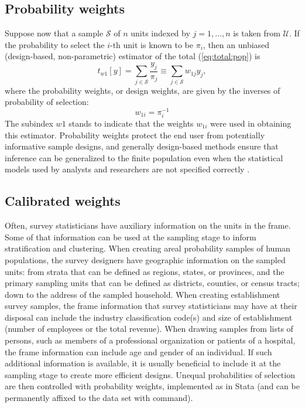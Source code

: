 \subsection{Probability weights}

Suppose now that a sample $\mathcal S$ of $n$ units indexed by $j=1,\ldots,n$
is taken from $\mathcal U$. If the probability to select the
$i$-th unit is known to be $\pi_i$, then an unbiased
(design-based, non-parametric) estimator
of the total (\ref{eq:total:pop}) is \citep{horvitz:thompson:1952}
\begin{equation}
   t_{w1}[y] = \sum_{j \in \mathcal{S}} \frac{y_j}{\pi_j}
   \equiv \sum_{j \in \mathcal{S}} w_{1j} y_j
   \label{eq:total:sample},
\end{equation}
where the probability weights, or design weights, are given by
the inverses of probability of selection:
\begin{equation}
   w_{1i} = \pi_i^{-1}
   \label{eq:prob:weight}
\end{equation}
The subindex $w1$ stands to indicate that the weights $w_{1i}$ were
used in obtaining this estimator. Probability weights protect
the end user from potentially informative sample designs, and generally
design-based methods ensure that inference can be generalized
to the finite population even when the statistical models used
by analysts and researchers are not specified correctly
\citep{pfeff:1993,binder:roberts:2003}.

\subsection{Calibrated weights}

Often, survey statisticians have auxiliary information on the units
in the frame. Some of that information can be used at the sampling
stage to inform stratification and clustering. When creating areal
probability samples of human populations, the survey designers have
geographic information on the sampled units: from strata
that can be defined as regions, states, or provinces, and the primary
sampling units that can be defined as districts, counties, or census tracts;
down to the address of the sampled household. When creating establishment
survey samples, the frame information that survey statisticians may have
at their disposal can include the industry classification code(s) and size
of establishment (number of employees or the total revenue).
When drawing samples from lists of persons, such as members of a
professional organization or patients of a hospital, the frame information
can include age and gender of an individual. If such additional information
is available, it is usually beneficial to include it at the sampling stage
to create more efficient designs. Unequal probabilities of selection
are then controlled with probability weights, implemented
as \stcmd{[pw=}{\it exp}\stcmd{]} in Stata (and can be permanently
affixed to the data set with  command).

